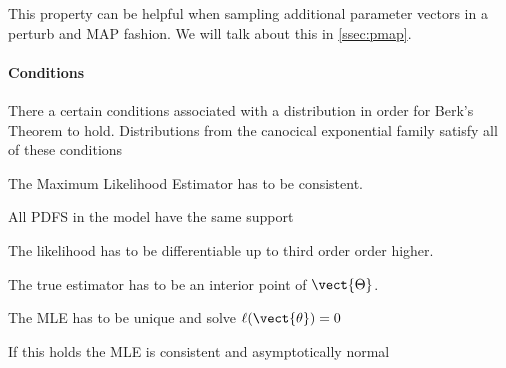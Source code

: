         This property can be helpful when sampling additional parameter vectors in a perturb and MAP fashion. We will talk about this in \sect \ref{ssec:pmap}.
        
        \paragraph*{Conditions}
        There a certain conditions associated with a distribution in order for Berk's Theorem to hold.
        Distributions from the canocical exponential family satisfy all of these conditions

        The Maximum Likelihood Estimator has to be consistent.

        All PDFS in the model have the same support

        The likelihood has to be differentiable up to third order order higher.

        The true estimator has to be an interior point of $\vect{\Theta}$.

        The MLE has to be unique and solve $\ell(\vect{\theta}) = 0$

        If this holds the MLE is consistent and asymptotically normal

